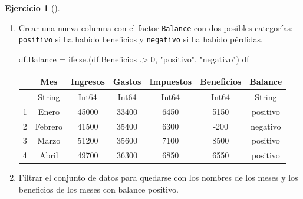 \documentclass[
  a4paper,
]{scrreport}
\newenvironment{Shaded}{\begin{snugshade}}{\end{snugshade}}
\newcommand{\FloatTok}[1]{\textcolor[rgb]{0.68,0.00,0.00}{#1}}
\newcommand{\FunctionTok}[1]{\textcolor[rgb]{0.28,0.35,0.67}{#1}}
\newcommand{\NormalTok}[1]{\textcolor[rgb]{0.00,0.23,0.31}{#1}}
\newcommand{\OperatorTok}[1]{\textcolor[rgb]{0.37,0.37,0.37}{#1}}
\newcommand{\StringTok}[1]{\textcolor[rgb]{0.13,0.47,0.30}{#1}}
\theoremstyle{definition}
\newtheorem{exercise}{Ejercicio}[chapter]
\theoremstyle{remark}
\begin{document}
\begin{exercise}[]
\begin{enumerate}
\begin{tcolorbox}
  \end{tcolorbox}
\item
  Crear una nueva columna con el factor \texttt{Balance} con dos
  posibles categorías: \texttt{positivo} si ha habido beneficios y
  \texttt{negativo} si ha habido pérdidas.

  \begin{tcolorbox}[enhanced jigsaw, toprule=.15mm, arc=.35mm, toptitle=1mm, colbacktitle=quarto-callout-tip-color!10!white, opacityback=0, left=2mm, colback=white, colframe=quarto-callout-tip-color-frame, rightrule=.15mm, breakable, leftrule=.75mm, coltitle=black, opacitybacktitle=0.6, titlerule=0mm, bottomtitle=1mm, title=\textcolor{quarto-callout-tip-color}{\faLightbulb}\hspace{0.5em}{Solución}, bottomrule=.15mm]

\begin{Shaded}
\begin{Highlighting}[]
\NormalTok{df.Balance }\OperatorTok{=} \FunctionTok{ifelse}\NormalTok{.(df.Beneficios }\OperatorTok{.\textgreater{}} \FloatTok{0}\NormalTok{, }\StringTok{"positivo"}\NormalTok{, }\StringTok{"negativo"}\NormalTok{)}
\NormalTok{df}
\end{Highlighting}
\end{Shaded}

  \begin{tabular}{r|cccccc}
      & Mes & Ingresos & Gastos & Impuestos & Beneficios & Balance\\
      \hline
      & String & Int64 & Int64 & Int64 & Int64 & String\\
      \hline
      1 & Enero & 45000 & 33400 & 6450 & 5150 & positivo \\
      2 & Febrero & 41500 & 35400 & 6300 & -200 & negativo \\
      3 & Marzo & 51200 & 35600 & 7100 & 8500 & positivo \\
      4 & Abril & 49700 & 36300 & 6850 & 6550 & positivo \\
  \end{tabular}

  \end{tcolorbox}
\item
  Filtrar el conjunto de datos para quedarse con los nombres de los
  meses y los beneficios de los meses con balance positivo.

  \begin{tcolorbox}[enhanced jigsaw, toprule=.15mm, arc=.35mm, toptitle=1mm, colbacktitle=quarto-callout-tip-color!10!white, opacityback=0, left=2mm, colback=white, colframe=quarto-callout-tip-color-frame, rightrule=.15mm, breakable, leftrule=.75mm, coltitle=black, opacitybacktitle=0.6, titlerule=0mm, bottomtitle=1mm, title=\textcolor{quarto-callout-tip-color}{\faLightbulb}\hspace{0.5em}{Solución}, bottomrule=.15mm]


\end{tcolorbox}
\end{enumerate}
\end{exercise}
\end{document}
